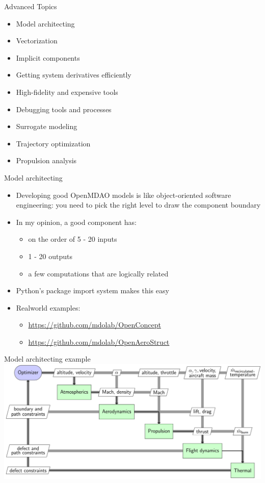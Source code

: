 \documentclass[aspectratio=169, usenames,dvipsnames, 14pt]{beamer}
\begin{document}
\begin{frame}{Advanced Topics}
	\begin{itemize}
		\item Model architecting
		\item Vectorization
		\item Implicit components
		\item Getting system derivatives efficiently
		\item High-fidelity and expensive tools
		\item Debugging tools and processes
		\item Surrogate modeling
		\item Trajectory optimization
		\item Propulsion analysis
	\end{itemize}
\end{frame}

\begin{frame}{Model architecting}
	\begin{itemize}
		\item Developing good OpenMDAO models is like object-oriented software engineering: you need to pick the right level to draw 				the component boundary
		\item In my opinion, a good component has:
			\begin{itemize}
				\item on the order of 5 - 20 inputs
				\item 1 - 20 outputs
				\item a few computations that are logically related
			\end{itemize}
		\item Python's package import system makes this easy
		\item Real\-world examples:
			\begin{itemize}
				\item \url{https://github.com/mdolab/OpenConcept}
				\item \url{https://github.com/mdolab/OpenAeroStruct}
			\end{itemize}
	\end{itemize}
\end{frame}

\begin{frame}{Model architecting example}
	\includegraphics[scale=.49]{images/slide_115.png}
\end{frame}
\end{document}
